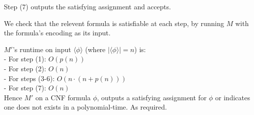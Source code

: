 Step (7) outputs the satisfying assignment and accepts.

We check that the relevent formula is satisfiable at each step, by running $M$ with the formula's encoding as its input.

$M'$'s runtime on input $\langle \phi \rangle$ (where $|\langle \phi \rangle|=n$) is: \\
- For step  (1):     $O(p(n))$                         \\
- For step  (2):     $O(n)$                            \\
- For steps (3-6):   $O(n \cdot (n+p(n)))$             \\
- For step (7):      $O(n)$                            \\

Hence $M'$ on a CNF formula $\phi$, outputs a satisfying assignment for $\phi$
or indicates one does not exists in a polynomial-time. As required. \\

{
\color{red}
}